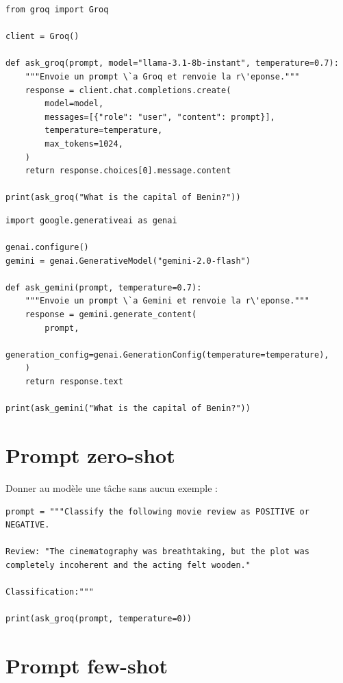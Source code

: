 \begin{verbatim}
from groq import Groq

client = Groq()

def ask_groq(prompt, model="llama-3.1-8b-instant", temperature=0.7):
    """Envoie un prompt \`a Groq et renvoie la r\'eponse."""
    response = client.chat.completions.create(
        model=model,
        messages=[{"role": "user", "content": prompt}],
        temperature=temperature,
        max_tokens=1024,
    )
    return response.choices[0].message.content

print(ask_groq("What is the capital of Benin?"))
\end{verbatim}

\begin{verbatim}
import google.generativeai as genai

genai.configure()
gemini = genai.GenerativeModel("gemini-2.0-flash")

def ask_gemini(prompt, temperature=0.7):
    """Envoie un prompt \`a Gemini et renvoie la r\'eponse."""
    response = gemini.generate_content(
        prompt,
        generation_config=genai.GenerationConfig(temperature=temperature),
    )
    return response.text

print(ask_gemini("What is the capital of Benin?"))
\end{verbatim}

\section{Prompt zero-shot}

Donner au mod\`ele une t\^ache sans aucun exemple :

\begin{verbatim}
prompt = """Classify the following movie review as POSITIVE or NEGATIVE.

Review: "The cinematography was breathtaking, but the plot was
completely incoherent and the acting felt wooden."

Classification:"""

print(ask_groq(prompt, temperature=0))
\end{verbatim}

\section{Prompt few-shot}

